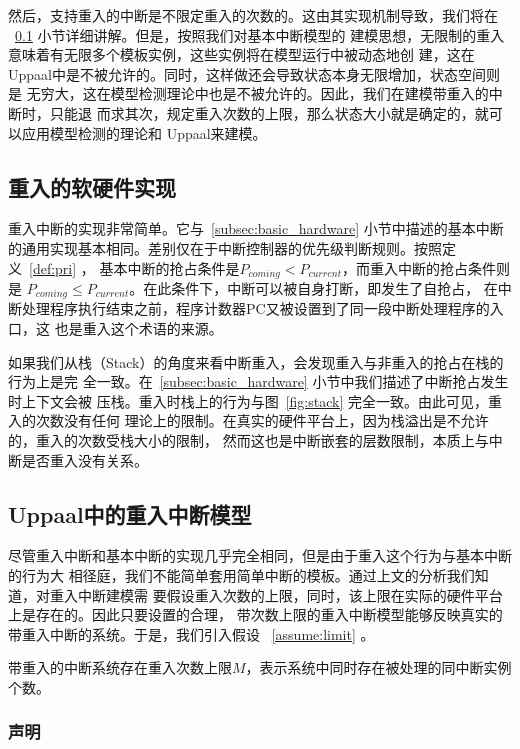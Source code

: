 然后，支持重入的中断是不限定重入的次数的。这由其实现机制导致，我们将在
~\ref{subsec:reentrant_hardware} 小节详细讲解。但是，按照我们对基本中断模型的
建模思想，无限制的重入意味着有无限多个模板实例，这些实例将在模型运行中被动态地创
建，这在Uppaal中是不被允许的。同时，这样做还会导致状态本身无限增加，状态空间则是
无穷大，这在模型检测理论中也是不被允许的。因此，我们在建模带重入的中断时，只能退
而求其次，规定重入次数的上限，那么状态大小就是确定的，就可以应用模型检测的理论和
Uppaal来建模。

\subsection{重入的软硬件实现}
\label{subsec:reentrant_hardware}

重入中断的实现非常简单。它与~\ref{subsec:basic_hardware} 小节中描述的基本中断
的通用实现基本相同。差别仅在于中断控制器的优先级判断规则。按照定义~\ref{def:pri} ，
基本中断的抢占条件是$P_{coming} < P_{current}$，而重入中断的抢占条件则是
$P_{coming} \leq P_{current}$。在此条件下，中断可以被自身打断，即发生了自抢占，
在中断处理程序执行结束之前，程序计数器PC又被设置到了同一段中断处理程序的入口，这
也是重入这个术语的来源。

如果我们从栈（Stack）的角度来看中断重入，会发现重入与非重入的抢占在栈的行为上是完
全一致。在~\ref{subsec:basic_hardware} 小节中我们描述了中断抢占发生时上下文会被
压栈。重入时栈上的行为与图~\ref{fig:stack} 完全一致。由此可见，重入的次数没有任何
理论上的限制。在真实的硬件平台上，因为栈溢出是不允许的，重入的次数受栈大小的限制，
然而这也是中断嵌套的层数限制，本质上与中断是否重入没有关系。

\subsection{Uppaal中的重入中断模型}
\label{subsec:reentrant_uppaal}

尽管重入中断和基本中断的实现几乎完全相同，但是由于重入这个行为与基本中断的行为大
相径庭，我们不能简单套用简单中断的模板。通过上文的分析我们知道，对重入中断建模需
要假设重入次数的上限，同时，该上限在实际的硬件平台上是存在的。因此只要设置的合理，
带次数上限的重入中断模型能够反映真实的带重入中断的系统。于是，我们引入假设
~\ref{assume:limit} 。

\begin{assumption}
	带重入的中断系统存在重入次数上限$M$，表示系统中同时存在被处理的同中断实例个数。
	\label{assume:limit}
\end{assumption}

\subsubsection{声明}
\label{subsubsec:reentrant_decl}

